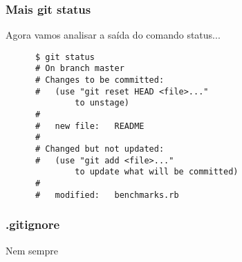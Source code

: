\documentclass[brazil]{beamer}
\begin{document}
\begin{frame}[fragile]
  \frametitle{Mais git status}
  Agora vamos analisar a saída do comando status...
  \begin{block}{}
    \begin{verbatim}
      $ git status
      # On branch master
      # Changes to be committed:
      #   (use "git reset HEAD <file>..." 
              to unstage)
      #
      #   new file:   README
      #
      # Changed but not updated:
      #   (use "git add <file>..." 
              to update what will be committed)
      #
      #   modified:   benchmarks.rb
    \end{verbatim}
  \end{block}
\end{frame}

\begin{frame}[fragile]
  \frametitle{.gitignore}
  Nem sempre 
\end{frame}
\end{document}
